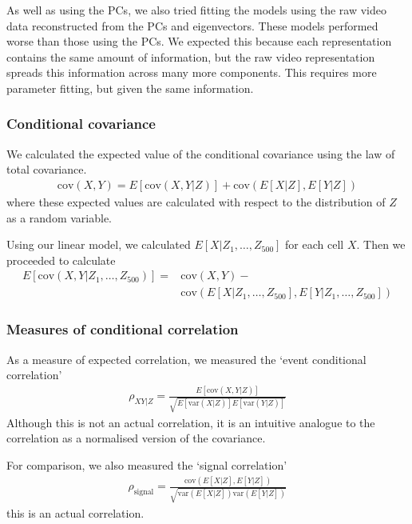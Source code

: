 \documentclass[a4paper,12pt]{article}
\theoremstyle{definition}
\newcommand{\cov}{\text{cov}} %
\newcommand{\var}{\text{var}} %
\begin{document}
        As well as using the PCs, we also tried fitting the models using the raw video data reconstructed from the PCs and eigenvectors. These models performed worse than those using the PCs. We expected this because each representation contains the same amount of information, but the raw video representation spreads this information across many more components. This requires more parameter fitting, but given the same information.

        \subsubsection{Conditional covariance}
        We calculated the expected value of the conditional covariance using the law of total covariance.
        \begin{align}\label{eq:law_of_total_covariance}
            \cov (X,Y) = E[ \cov(X,Y|Z)] + \cov(E[X|Z], E[Y|Z])
        \end{align}
        where these expected values are calculated with respect to the distribution of $Z$ as a random variable.

        Using our linear model, we calculated $E[X|Z_1,\dots, Z_{500}]$ for each cell $X$. Then we proceeded to calculate
        \begin{align}
            E[\cov(X,Y|Z_1,\dots, Z_{500})] = & \cov(X,Y) - \\
              & \cov(E[X|Z_1,\dots, Z_{500}], E[Y|Z_1,\dots, Z_{500}])
        \end{align}

        \subsubsection{Measures of conditional correlation}\label{sec:cond_corr}
        As a measure of expected correlation, we measured the `event conditional correlation' \cite{maugis}
        \begin{align}\label{eq:event_conditional_correlation}
            \rho_{XY|Z} = \frac{E[\cov(X,Y|Z)]}{\sqrt{E[\var(X|Z)]E[\var(Y|Z)]}}
        \end{align}
        Although this is not an actual correlation, it is an intuitive analogue to the correlation as a normalised version of the covariance.

        For comparison, we also measured the `signal correlation'
        \begin{align}\label{eq:signal_correlation}
            \rho_{\text{signal}} = \frac{\cov(E[X|Z], E[Y|Z])}{\sqrt{\var(E[X|Z])\var(E[Y|Z])}}
        \end{align}
        this is an actual correlation.
\end{document}
